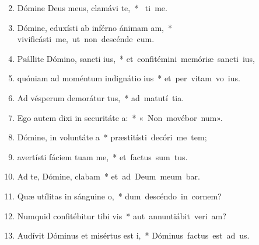 \begin{flushleft}
\begin{enumerate}[leftmargin=*]
\setcounter{enumi}{1}

\item Dómine Deus meus, clamávi  te,~* \mbox{ ti me.}

\item Dómine, eduxísti ab inférno ánimam am,~* \mbox{vivificásti me, ut non descénde  cum.}

\item Psállite Dómino, sancti ius,~* \mbox{et confitémini memóriæ sancti ius,}

\item quóniam ad moméntum indignátio ius~* \mbox{et per vitam vo ius.}

\item Ad vésperum demorátur tus,~* \mbox{ad matutí tia.}

\item Ego autem dixi in securitáte a:~* \mbox{« Non movébor  num».}

\item Dómine, in voluntáte a~* \mbox{præstitísti decóri me tem;}

\item avertísti fáciem tuam  me,~* \mbox{et factus sum tus.}

\item Ad te, Dómine, clabam~* \mbox{et ad Deum meum bar.}

\item Quæ utílitas in sánguine o,~* \mbox{dum descéndo in cornem?}

\item Numquid confitébitur tibi vis~* \mbox{aut annuntiábit veri am?}

\item Audívit Dóminus et misértus est i,~* \mbox{Dóminus factus est ad us.}


\end{enumerate}
\end{flushleft}
